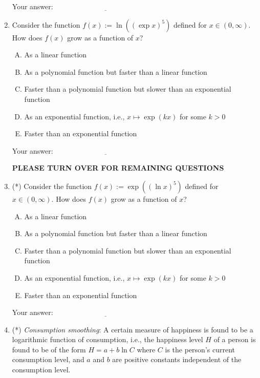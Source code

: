 \documentclass[10pt]{amsart}
\begin{document}
\begin{enumerate}
  \vspace{0.1in}
  Your answer: $\underline{\qquad\qquad\qquad\qquad\qquad\qquad\qquad}$
  \vspace{0.6in}

\item Consider the function $f(x) := \ln((\exp x)^5)$ defined for $x \in
  (0,\infty)$. How does $f(x)$ grow as a function of $x$?

  \begin{enumerate}[(A)]
  \item As a linear function
  \item As a polynomial function but faster than a linear function
  \item Faster than a polynomial function but slower than an
    exponential function
  \item As an exponential function, i.e., $x \mapsto \exp(kx)$ for some $k > 0$
  \item Faster than an exponential function
  \end{enumerate}

  \vspace{0.1in}
  Your answer: $\underline{\qquad\qquad\qquad\qquad\qquad\qquad\qquad}$
  \vspace{0.6in}

  {\bf PLEASE TURN OVER FOR REMAINING QUESTIONS}

\newpage
\item (*) Consider the function $f(x) := \exp((\ln x)^5)$ defined for
  $x \in (0,\infty)$. How does $f(x)$ grow as a function of $x$?

  \begin{enumerate}[(A)]
  \item As a linear function
  \item As a polynomial function but faster than a linear function
  \item Faster than a polynomial function but slower than an
    exponential function
  \item As an exponential function, i.e., $x \mapsto \exp(kx)$ for some $k > 0$
  \item Faster than an exponential function
  \end{enumerate}

  \vspace{0.1in}
  Your answer: $\underline{\qquad\qquad\qquad\qquad\qquad\qquad\qquad}$
  \vspace{0.6in}

\item (*) {\em Consumption smoothing}: A certain measure of happiness
  is found to be a logarithmic function of consumption, i.e., the
  happiness level $H$ of a person is found to be of the form $H = a +
  b \ln C$ where $C$ is the person's current consumption level, and
  $a$ and $b$ are positive constants independent of the consumption
  level.


\end{enumerate}
\end{document}
